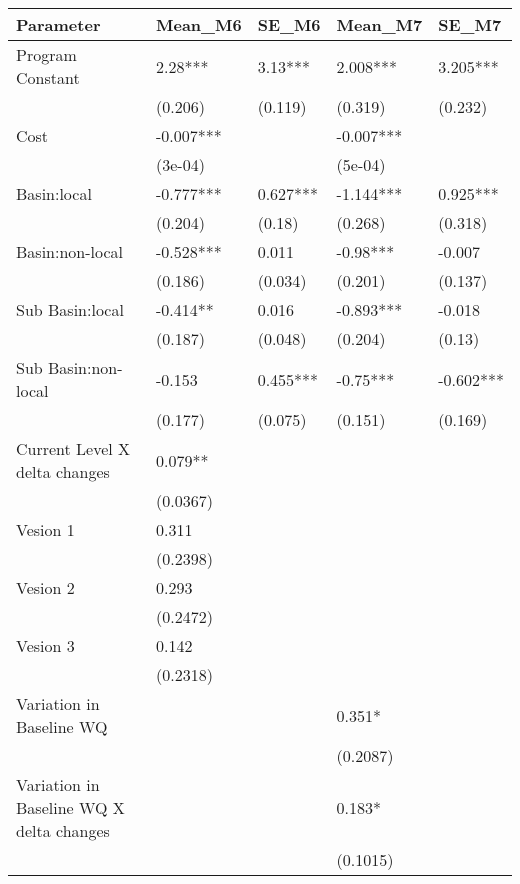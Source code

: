 \begin{table}[ht]
\centering
\begin{tabular}{lllll}
  \hline
Parameter & Mean\_M6 & SE\_M6 & Mean\_M7 & SE\_M7 \\ 
  \hline
Program Constant & 2.28*** & 3.13*** & 2.008*** & 3.205*** \\ 
   & (0.206) & (0.119) & (0.319) & (0.232) \\ 
  Cost & -0.007*** &  & -0.007*** &  \\ 
   & (3e-04) &  & (5e-04) &  \\ 
  Basin:local & -0.777*** & 0.627*** & -1.144*** & 0.925*** \\ 
   & (0.204) & (0.18) & (0.268) & (0.318) \\ 
  Basin:non-local & -0.528*** & 0.011 & -0.98*** & -0.007 \\ 
   & (0.186) & (0.034) & (0.201) & (0.137) \\ 
  Sub Basin:local & -0.414** & 0.016 & -0.893*** & -0.018 \\ 
   & (0.187) & (0.048) & (0.204) & (0.13) \\ 
  Sub Basin:non-local & -0.153 & 0.455*** & -0.75*** & -0.602*** \\ 
   & (0.177) & (0.075) & (0.151) & (0.169) \\ 
  Current Level X delta changes & 0.079** &  &  &  \\ 
   & (0.0367) &  &  &  \\ 
  Vesion 1 & 0.311 &  &  &  \\ 
   & (0.2398) &  &  &  \\ 
  Vesion 2 & 0.293 &  &  &  \\ 
   & (0.2472) &  &  &  \\ 
  Vesion 3 & 0.142 &  &  &  \\ 
   & (0.2318) &  &  &  \\ 
  Variation in Baseline WQ &  &  & 0.351* &  \\ 
   &  &  & (0.2087) &  \\ 
  Variation in Baseline WQ X delta changes &  &  & 0.183* &  \\ 
   &  &  & (0.1015) &  \\ 
   \hline
\end{tabular}
\end{table}
